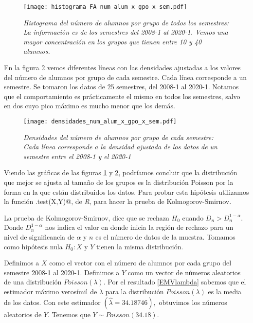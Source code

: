 \begin{figure}[H]
\centering
\texttt{[image: histograma\_FA\_num\_alum\_x\_gpo\_x\_sem.pdf]} %
\caption[\textit{Histograma del número de alumnos por grupo de todos los semestres}]{\textit{Histograma del número de alumnos por grupo de todos los semestres: La información es de los semestres del 2008-1 al 2020-1. Vemos una mayor concentración en los grupos que tienen entre 10 y 40 alumnos.}}\label{histNumAl_x_gpo_x_sem}
\end{figure}


En la figura \ref{densidadesNumAl_x_gpo_x_sem} vemos diferentes líneas con las densidades ajustadas a los valores del número de alumnos por grupo de cada semestre. Cada línea corresponde a un semestre. Se tomaron los datos de 25 semestres, del 2008-1 al 2020-1. Notamos que el comportamiento es prácticamente el mismo en todos los semestres, salvo en dos cuyo pico máximo es mucho menor que los demás. 

\begin{figure}[H]
\centering
\texttt{[image: densidades\_num\_alum\_x\_gpo\_x\_sem.pdf]} %
\caption[\textit{Densidades del número de alumnos por grupo de cada semestre}]{\textit{Densidades del número de alumnos por grupo de cada semestre: Cada línea corresponde a la densidad ajustada de los datos de un semestre entre el 2008-1 y el 2020-1}}\label{densidadesNumAl_x_gpo_x_sem}
\end{figure}

Viendo las gráficas de las figuras \ref{histNumAl_x_gpo_x_sem} y \ref{densidadesNumAl_x_gpo_x_sem}, podríamos concluir que la distribución que mejor se ajusta al tamaño de los grupos es la distribución Poisson por la forma en la que están distribuidos los datos. Para probar esta hipótesis utilizamos la función \verb@ks.test(X,Y)@, de \textit{R}, para hacer la prueba de Kolmogorov-Smirnov.

La prueba de Kolmogorov-Smirnov, dice que se rechaza $H_{0}$ cuando $D_{n} > D_{n}^{1-\alpha}$. Donde $D_{n}^{1-\alpha}$ nos indica el valor en donde inicia la región de rechazo para un nivel de significancia de $\alpha$ y $n$ es el número de datos de la muestra. Tomamos como hipótesis nula $H_{0}: X$ y $Y$ tienen la misma distribución.

Definimos a $X$ como el vector con el número de alumnos por cada grupo del semestre 2008-1 al 2020-1. Definimos a $Y$ como un vector de números aleatorios de una distribución $Poisson(\lambda)$. Por el resultado \ref{EMVlambda} sabemos que el estimador máximo verosímil de $\lambda$ para la distribución $Poisson(\lambda)$ es la media de los datos. Con este estimador $(\hat{\lambda} = 34.18746),$ obtuvimos los números aleatorios de $Y$. Tenemos que $Y \sim Poisson(34.18)$.

